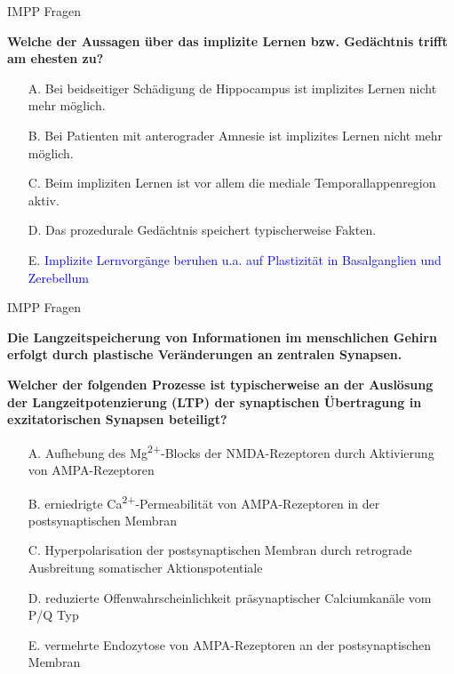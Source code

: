 \documentclass{beamer}
\begin{document}
\begin{frame}{IMPP Fragen}

\textbf{Welche der Aussagen über das implizite Lernen bzw. Gedächtnis trifft am ehesten zu?} \\[0.2 cm]

\begin{itemize}
\item[A.] Bei beidseitiger Schädigung de Hippocampus ist implizites Lernen nicht mehr möglich.
\item[B.] Bei Patienten mit anterograder Amnesie ist implizites Lernen nicht mehr möglich.
\item[C.] Beim impliziten Lernen ist vor allem die mediale Temporallappenregion aktiv.
\item[D.] Das prozedurale Gedächtnis speichert typischerweise Fakten.
\item[E.] \textcolor{blue}{Implizite Lernvorgänge beruhen u.a. auf Plastizität in Basalganglien und Zerebellum} %

\end{itemize}

\end{frame}




\begin{frame}{IMPP Fragen}

\textbf{Die Langzeitspeicherung von Informationen im menschlichen Gehirn erfolgt durch plastische Veränderungen an zentralen Synapsen.}

\textbf{Welcher der folgenden Prozesse ist typischerweise an der Auslösung der Langzeitpotenzierung (LTP) der synaptischen Übertragung in exzitatorischen Synapsen beteiligt? } \\[0.2 cm]

\begin{itemize}
\item[A.] Aufhebung des Mg\textsuperscript{2+}-Blocks der NMDA-Rezeptoren durch Aktivierung von AMPA-Rezeptoren
\item[B.] erniedrigte Ca\textsuperscript{2+}-Permeabilität von AMPA-Rezeptoren in der postsynaptischen Membran
\item[C.] Hyperpolarisation der postsynaptischen Membran durch retrograde Ausbreitung somatischer Aktionspotentiale
\item[D.] reduzierte Offenwahrscheinlichkeit präsynaptischer Calciumkanäle vom P/Q Typ
\item[E.] vermehrte Endozytose von AMPA-Rezeptoren an der postsynaptischen Membran

\end{itemize}

\end{frame}
\end{document}
